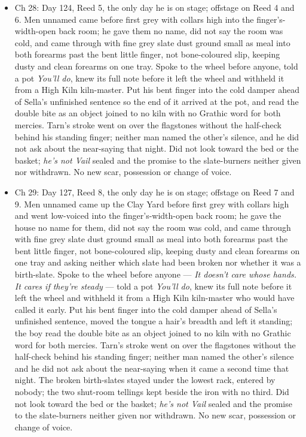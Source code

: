 \documentclass{design/chronicle}
\begin{document}
{\begin{itemize}[leftmargin=1.4em,itemsep=1pt,topsep=3pt,parsep=0pt]
\item Ch 28: Day 124, Reed 5, the only day he is on stage; offstage on Reed 4 and 6. Men unnamed came before first grey with collars high into the finger’s-width-open back room; he gave them no name, did not say the room was cold, and came through with fine grey slate dust ground small as meal into both forearms past the bent little finger, not bone-coloured slip, keeping dusty and clean forearms on one tray. Spoke to the wheel before anyone, told a pot \emph{You’ll do}, knew its full note before it left the wheel and withheld it from a High Kiln kiln-master. Put his bent finger into the cold damper ahead of Sella’s unfinished sentence so the end of it arrived at the pot, and read the double bite as an object joined to no kiln with no Grathic word for both mercies. Tarn’s stroke went on over the flagstones without the half-check behind his standing finger; neither man named the other’s silence, and he did not ask about the near-saying that night. Did not look toward the bed or the basket; \emph{he’s not Vail} sealed and the promise to the slate-burners neither given nor withdrawn. No new scar, possession or change of voice.

\end{itemize}

\begin{itemize}[leftmargin=1.4em,itemsep=1pt,topsep=3pt,parsep=0pt]

\item Ch 29: Day 127, Reed 8, the only day he is on stage; offstage on Reed 7 and 9. Men unnamed came up the Clay Yard before first grey with collars high and went low-voiced into the finger’s-width-open back room; he gave the house no name for them, did not say the room was cold, and came through with fine grey slate dust ground small as meal into both forearms past the bent little finger, not bone-coloured slip, keeping dusty and clean forearms on one tray and asking neither which slate had been broken nor whether it was a birth-slate. Spoke to the wheel before anyone — \emph{It doesn’t care whose hands. It cares if they’re steady} — told a pot \emph{You’ll do}, knew its full note before it left the wheel and withheld it from a High Kiln kiln-master who would have called it early. Put his bent finger into the cold damper ahead of Sella’s unfinished sentence, moved the tongue a hair’s breadth and left it standing; the boy read the double bite as an object joined to no kiln with no Grathic word for both mercies. Tarn’s stroke went on over the flagstones without the half-check behind his standing finger; neither man named the other’s silence and he did not ask about the near-saying when it came a second time that night. The broken birth-slates stayed under the lowest rack, entered by nobody; the two shut-room tellings kept beside the iron with no third. Did not look toward the bed or the basket; \emph{he’s not Vail} sealed and the promise to the slate-burners neither given nor withdrawn. No new scar, possession or change of voice.

\end{itemize}
}
\end{document}
